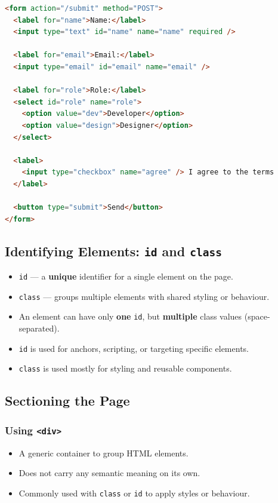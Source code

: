\documentclass[hidelinks]{article}
\begin{document}
\begin{lstlisting}[language=HTML, caption={Sample HTML form}]
<form action="/submit" method="POST">
  <label for="name">Name:</label>
  <input type="text" id="name" name="name" required />

  <label for="email">Email:</label>
  <input type="email" id="email" name="email" />

  <label for="role">Role:</label>
  <select id="role" name="role">
    <option value="dev">Developer</option>
    <option value="design">Designer</option>
  </select>

  <label>
    <input type="checkbox" name="agree" /> I agree to the terms
  </label>

  <button type="submit">Send</button>
</form>
\end{lstlisting}

\subsection{Identifying Elements: \texttt{id} and \texttt{class}}
\begin{itemize}
  \item \texttt{id} --- a \textbf{unique} identifier for a single element on the page.
  \item \texttt{class} --- groups multiple elements with shared styling or behaviour.
  \item An element can have only \textbf{one} \texttt{id}, but \textbf{multiple} class values (space-separated).
  \item \texttt{id} is used for anchors, scripting, or targeting specific elements.
  \item \texttt{class} is used mostly for styling and reusable components.
\end{itemize}

\subsection{Sectioning the Page}

\subsubsection{Using \texttt{<div>}}
\begin{itemize}
  \item A generic container to group HTML elements.
  \item Does not carry any semantic meaning on its own.
  \item Commonly used with \texttt{class} or \texttt{id} to apply styles or behaviour.
\end{itemize}
\end{document}

